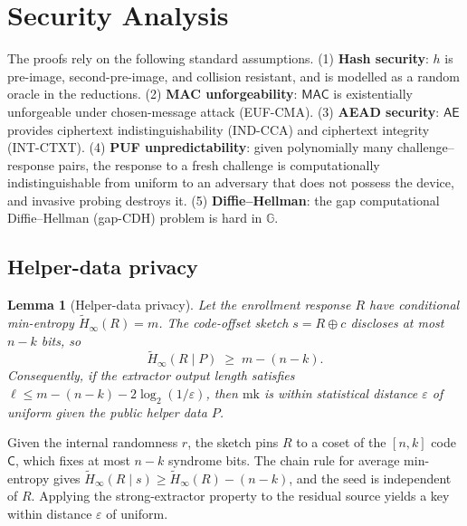 \documentclass[journal]{IEEEtran}
\newtheorem{lemma}[theorem]{Lemma}
\begin{document}
\section{Security Analysis}
\label{sec:security}

The proofs rely on the following standard assumptions. (1) \textbf{Hash
security}: $h$ is pre-image, second-pre-image, and collision resistant, and is
modelled as a random oracle in the reductions. (2) \textbf{MAC
unforgeability}: $\mathsf{MAC}$ is existentially unforgeable under
chosen-message attack (EUF-CMA). (3) \textbf{AEAD security}: $\mathsf{AE}$
provides ciphertext indistinguishability (IND-CCA) and ciphertext integrity
(INT-CTXT). (4) \textbf{PUF unpredictability}: given polynomially many
challenge--response pairs, the response to a fresh challenge is computationally
indistinguishable from uniform to an adversary that does not possess the
device, and invasive probing destroys it. (5) \textbf{Diffie--Hellman}: the gap
computational Diffie--Hellman (gap-CDH) problem is hard in $\mathbb{G}$.

\subsection{Helper-data privacy}

\begin{lemma}[Helper-data privacy]
\label{lem:helper}
Let the enrollment response $R$ have conditional min-entropy
$\widetilde{H}_\infty(R) = m$. The code-offset sketch $s = R \oplus c$
discloses at most $n-k$ bits, so
\begin{equation}
\widetilde{H}_\infty(R \mid P) \;\ge\; m - (n-k).
\end{equation}
Consequently, if the extractor output length satisfies
$\ell \le m - (n-k) - 2\log_2(1/\varepsilon)$, then $\text{mk}$ is within
statistical distance $\varepsilon$ of uniform given the public helper data $P$.
\end{lemma}

\begin{IEEEproof}
Given the internal randomness $r$, the sketch pins $R$ to a coset of the
$[n,k]$ code $\mathsf{C}$, which fixes at most $n-k$ syndrome bits. The chain
rule for average min-entropy gives
$\widetilde{H}_\infty(R \mid s) \ge \widetilde{H}_\infty(R) - (n-k)$, and the
seed is independent of $R$. Applying the strong-extractor property to the
residual source yields a key within distance $\varepsilon$ of uniform.
\end{IEEEproof}
\end{document}
